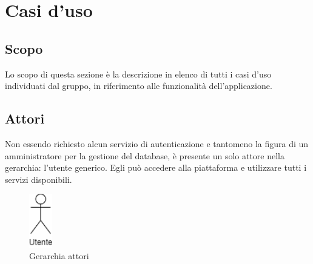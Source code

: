 \section{Casi d'uso}
\subsection{Scopo}
Lo scopo di questa sezione è la descrizione in elenco di tutti i casi d'uso individuati dal gruppo, in riferimento alle funzionalità dell'applicazione.
\subsection{Attori}
Non essendo richiesto alcun servizio di autenticazione e tantomeno la figura di un amministratore per la gestione del database, è presente un solo attore nella gerarchia: l'utente generico. Egli può accedere alla piattaforma e utilizzare tutti i servizi disponibili.

\begin{figure}[h]
\includegraphics[width=1cm]{Section/Images/Utente.png}
\centering
\caption{Gerarchia attori}
\end{figure}

\newpage






















\newpage






\newpage




\newpage




\newpage











